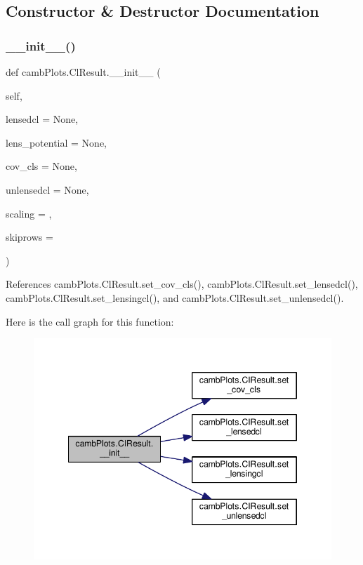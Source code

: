 \subsection{Constructor \& Destructor Documentation}
\mbox{\label{classcambPlots_1_1ClResult_abcd4d1fa21956cc6cefd41abbfd7500e}} 
\subsubsection{\texorpdfstring{\+\_\+\+\_\+init\+\_\+\+\_\+()}{\_\_init\_\_()}}
{\footnotesize\ttfamily def camb\+Plots.\+Cl\+Result.\+\_\+\+\_\+init\+\_\+\+\_\+ (\begin{DoxyParamCaption}\item[{}]{self,  }\item[{}]{lensedcl = {\ttfamily None},  }\item[{}]{lens\+\_\+potential = {\ttfamily None},  }\item[{}]{cov\+\_\+cls = {\ttfamily None},  }\item[{}]{unlensedcl = {\ttfamily None},  }\item[{}]{scaling = {},  }\item[{}]{skiprows = {} }\end{DoxyParamCaption})}



References camb\+Plots.\+Cl\+Result.\+set\+\_\+cov\+\_\+cls(), camb\+Plots.\+Cl\+Result.\+set\+\_\+lensedcl(), camb\+Plots.\+Cl\+Result.\+set\+\_\+lensingcl(), and camb\+Plots.\+Cl\+Result.\+set\+\_\+unlensedcl().

Here is the call graph for this function\+:
\nopagebreak
\begin{figure}[H]
\begin{center}
\leavevmode
\includegraphics[width=346pt]{classcambPlots_1_1ClResult_abcd4d1fa21956cc6cefd41abbfd7500e_cgraph}
\end{center}
\end{figure}



